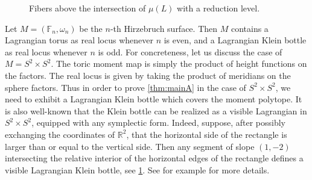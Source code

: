 \documentclass[10pt,oneside,reqno]{amsart}
\theoremstyle{definition}
\newcommand{\IR}{\mathbb{R}}
\newcommand{\FF}{\mathbb{F}}
\begin{document}
\begin{figure}[h]
        \caption{Fibers above the intersection of $\mu(L)$ with a reduction level.}
        \label{fig:Fibers}
\end{figure}
Let $M = (\FF_n,\omega_n)$ be the $n$-th Hirzebruch surface. Then $M$ contains a Lagrangian torus as real locus whenever $n$ is even, and a Lagrangian Klein bottle as real locus whenever $n$ is odd. For concreteness, let us discuss the case of $M=S^2\times S^2$. The toric moment map is simply the product of height functions on the factors. The real locus is given by taking the product of meridians on the sphere factors. Thus in order to prove \cref{thm:mainA} in the case of $S^2\times S^2$, we need to exhibit a Lagrangian Klein bottle which covers the moment polytope. It is also well-known that the Klein bottle can be realized as a visible Lagrangian in $S^2 \times S^2$, equipped with any symplectic form. Indeed, suppose, after possibly exchanging the coordinates of $\IR^2$, that the horizontal side of the rectangle is larger than or equal to the vertical side. Then any segment of slope $(1,-2)$ intersecting the relative interior of the horizontal edges of the rectangle defines a visible Lagrangian Klein bottle, see \cref{fig:Fibers}. See for example \cite[Exercise 5.19]{evans2023lectures} for more details.
\end{document}
